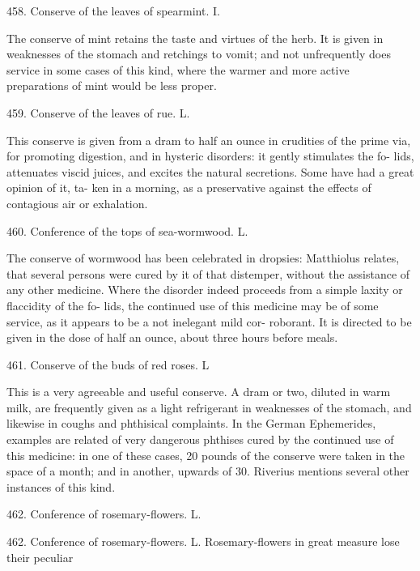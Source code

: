 \documentclass{article}
\begin{document}
458. Conserve of the leaves of spearmint. I.

The conserve of mint retains the taste and virtues
of the herb. It is given in weaknesses of the stomach
and retchings to vomit; and not unfrequently does
service in some cases of this kind, where the warmer
and more active preparations of mint would be less
proper.

459. Conserve of the leaves of rue. L.

This conserve is given from a dram to half an ounce
in crudities of the prime via, for promoting digestion,
and in hysteric disorders: it gently stimulates the fo-
lids, attenuates viscid juices, and excites the natural
secretions. Some have had a great opinion of it, ta-
ken in a morning, as a preservative against the effects
of contagious air or exhalation.

460. Conference of the tops of sea-wormwood. L.

The conserve of wormwood has been celebrated in
dropsies: Matthiolus relates, that several persons were
cured by it of that distemper, without the assistance
of any other medicine. Where the disorder indeed
proceeds from a simple laxity or flaccidity of the fo-
lids, the continued use of this medicine may be of some
service, as it appears to be a not inelegant mild cor-
roborant. It is directed to be given in the dose of
half an ounce, about three hours before meals.

461. Conserve of the buds of red roses. L

This is a very agreeable and useful conserve. A dram or two, diluted in warm milk, are frequently given as a light refrigerant in weaknesses of the stomach, and likewise in coughs and phthisical complaints. In the German Ephemerides, examples are related of very dangerous phthises cured by the continued use of this medicine: in one of these cases, 20 pounds of the conserve were taken in the space of a month; and in another, upwards of 30. Riverius mentions several other instances of this kind.

462. Conference of rosemary-flowers. L.

462. Conference of rosemary-flowers. L.
Rosemary-flowers in great measure lose their peculiar
\end{document}
